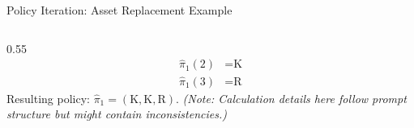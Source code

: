 \documentclass[10pt]{beamer}
\begin{document}
\begin{frame}{Policy Iteration: Asset Replacement Example}
\begin{columns}[T]
\begin{column}{0.55\textwidth}
\begin{align*}
                 \hat{\pi}_1(2) &= \text{K} \\ %
                 \hat{\pi}_1(3) &= \text{R} %
            \end{align*}
            Resulting policy: $\hat{\pi}_1 = (\text{K}, \text{K}, \text{R})$.
            \emph{(Note: Calculation details here follow prompt structure but might contain inconsistencies.)}
        \end{column}
    \end{columns}
\end{frame}

\end{document}
